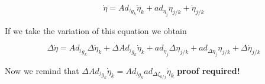 \documentclass[12pt,a4paper]{book}
\newcommand{\jgk}{\ensuremath{{^j g _k}}}
\renewcommand{\Adjgk}{\ensuremath{Ad_{\jgk}}}
\newcommand{\doteta}{\ensuremath{\dot{\eta}}}
\newcommand{\etajk}{\ensuremath{\eta_{j/k}}}
\begin{document}
\begin{equation}
	\dot{\eta} = \Adjgk \doteta_k + ad_{\eta_j} \etajk + \dot{\eta}_{j/k}
\end{equation}

If we take the variation of this equation we obtain

\begin{equation}
	\Delta \dot{\eta} = \Adjgk \Delta \doteta_k + \Delta \Adjgk \doteta_k +  ad_{\eta_j} \Delta \etajk    +    ad_{\Delta \eta_j} \etajk    + \Delta \dot{\eta}_{j/k}
\end{equation}

Now we remind that $\Delta \Adjgk \doteta_k = \Adjgk{} ad_{\Delta \zeta_{k/j}} \doteta _k$ \color{red}\textbf{proof required!}\color{black}



\end{document}

